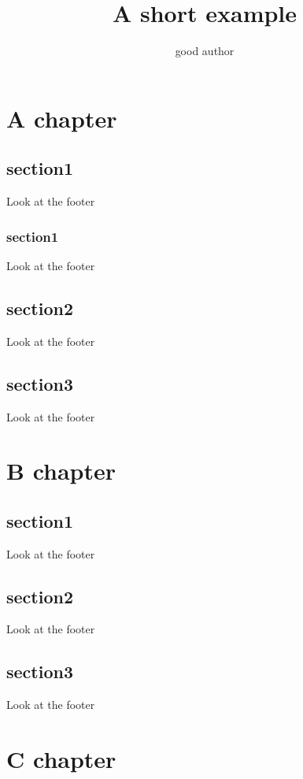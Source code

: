 \documentclass[a4paper,twoside]{report}
\title{A short example}
\author{good author}
\begin{document}
\maketitle
\tableofcontents
\pagestyle{IHA-fancy-style}

\chapter{A chapter}
\zhlipsum[1]

\newpage

\section{section1}
Look at the footer
\zhlipsum[2-6]
\subsection{section1}
Look at the footer
\zhlipsum[2-6]
\section{section2}
Look at the footer
\zhlipsum[2-6]
\section{section3}
Look at the footer
\zhlipsum[2-6]


\chapter{B chapter}
\zhlipsum[1]

\newpage

\section{section1}
Look at the footer
\zhlipsum[2-6]
\section{section2}
Look at the footer
\zhlipsum[2-6]
\section{section3}
Look at the footer
\zhlipsum[2-6]

\chapter{C chapter}
\zhlipsum[1]
\end{document}
